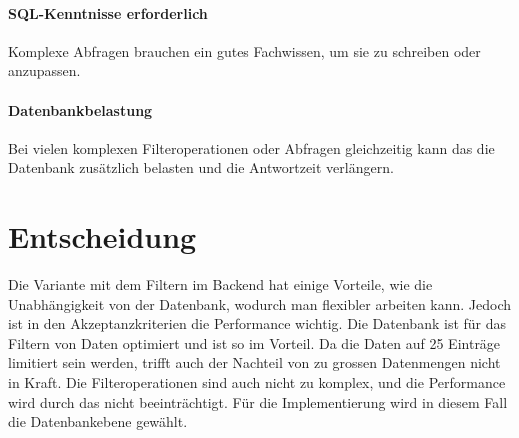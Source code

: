 \paragraph{SQL-Kenntnisse erforderlich} Komplexe Abfragen brauchen ein gutes Fachwissen, um sie zu schreiben oder anzupassen.
\paragraph{Datenbankbelastung} Bei vielen komplexen Filteroperationen oder Abfragen gleichzeitig kann das die Datenbank zusätzlich belasten und die Antwortzeit verlängern.

\section{Entscheidung}
Die Variante mit dem Filtern im Backend hat einige Vorteile, wie die Unabhängigkeit von der Datenbank, wodurch man flexibler arbeiten kann. Jedoch ist in den Akzeptanzkriterien die Performance wichtig. Die Datenbank ist für das Filtern von Daten optimiert und ist so im Vorteil. Da die Daten auf 25 Einträge limitiert sein werden, trifft auch der Nachteil von zu grossen Datenmengen nicht in Kraft. Die Filteroperationen sind auch nicht zu komplex, und die Performance wird durch das nicht beeinträchtigt. Für die Implementierung wird in diesem Fall die Datenbankebene gewählt.
\newpage
